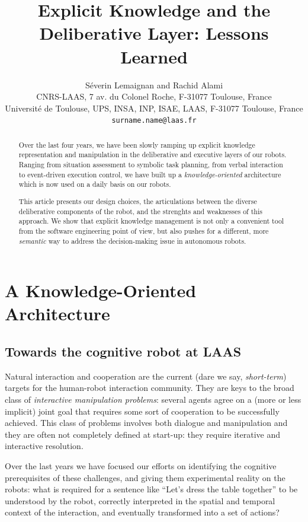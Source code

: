 \documentclass[letterpaper, 10 pt, conference]{ieeeconf}  %
\title{\LARGE \bf
Explicit Knowledge and the Deliberative Layer: Lessons Learned
}
\author{Séverin Lemaignan and Rachid Alami\\
CNRS-LAAS, 7 av. du Colonel Roche, F-31077 Toulouse, France\\
Université de Toulouse, UPS, INSA, INP, ISAE, LAAS, F-31077 Toulouse, France\\
{\tt surname.name@laas.fr}
}
\begin{document}
\maketitle
\thispagestyle{empty}
\pagestyle{empty}


\begin{abstract}

Over the last four years, we have been slowly ramping up explicit knowledge
representation and manipulation in the deliberative and executive layers of our
robots. Ranging from situation assessment to symbolic task planning, from
verbal interaction to event-driven execution control, we have built up a
\emph{knowledge-oriented} architecture which is now used on a daily basis on our
robots.

This article presents our design choices, the articulations between the diverse
deliberative components of the robot, and the strenghts and weaknesses of this
approach. We show that explicit knowledge management is not only a convenient
tool from the software engineering point of view, but also pushes for a
different, more \emph{semantic} way to address the decision-making issue in
autonomous robots.

\end{abstract}


\section{A Knowledge-Oriented Architecture}

\subsection{Towards the cognitive robot at LAAS}

Natural interaction and cooperation are the current (dare we say,
\emph{short-term}) targets for the human-robot interaction community. They are
keys to the broad class of \emph{interactive manipulation problems}: several
agents agree on a (more or less implicit) joint goal that requires some sort of
cooperation to be successfully achieved. This class of problems involves both
dialogue and manipulation and they are often not completely defined at
start-up: they require iterative and interactive resolution.

Over the last years we have focused our efforts on identifying the cognitive
prerequisites of these challenges, and giving them experimental reality on the
robots: what is required for a sentence like ``Let's dress the table together''
to be understood by the robot, correctly interpreted in the spatial and
temporal context of the interaction, and eventually transformed into a set of
actions?
\end{document}
